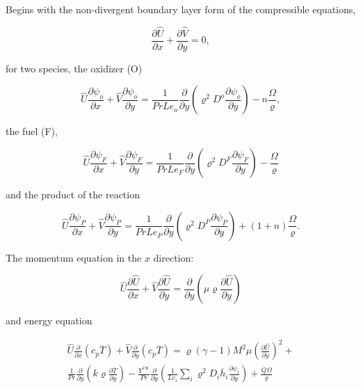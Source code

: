 Begins with the non-divergent boundary layer form of the compressible equations,

\begin{equation} 
\frac{\partial \hat{U}}{\partial x}+
\frac{\partial \hat{V}}{\partial y}
=0
,
\end{equation} 

for two  species, the oxidizer (O)  

\begin{equation} 
 \hat{U}\frac{\partial \psi_{o}}{\partial x}+
 \hat{V}\frac{\partial \psi_{o}}{\partial y}
=
\frac{1}{PrLe_o}\frac{\partial}{\partial y}
\left(\varrho^2 D^o\frac{\partial \psi_o}{\partial y}\right)
-
n
\frac{\Omega}{\varrho}
,
\end{equation} 
  
the fuel (F), 

\begin{equation} 
 \hat{U}\frac{\partial \psi_{F}}{\partial x}+
 \hat{V}\frac{\partial \psi_{F}}{\partial y}
=
\frac{1}{PrLe_F}\frac{\partial}{\partial y}
\left(
       \varrho^2 D^F\frac{\partial \psi_F}{\partial y}
\right)
- 
\frac{\Omega}{\varrho}
\end{equation} 

and the product of the reaction  

\begin{equation} 
 \hat{U}\frac{\partial \psi_{P}}{\partial x}+
 \hat{V}\frac{\partial \psi_{P}}{\partial y}
=
\frac{1}{PrLe_P}\frac{\partial}{\partial y}
\left(
       \varrho^2 D^P\frac{\partial \psi_P}{\partial y}
\right)
+ 
(1+n)
\frac{\Omega}{\varrho}
.
\end{equation} 

The momentum equation in the $x$ direction:
  
\begin{equation} 
 \hat{U}\frac{\partial \hat{U}}{\partial x}+
 \hat{V}\frac{\partial \hat{U}}{\partial y}=
\frac{\partial}{\partial y}\left(\mu\varrho\frac{\partial \hat{U}}{\partial  y}\right)
\end{equation} 
  
and energy equation 
  
\begin{equation}
\begin{split}
\hat{U}\frac{\partial }{\partial x}(c_p \overline{T})+
\hat{V}
\frac{\partial }{\partial y}(c_p \overline{T})=
\varrho
(\gamma-1)M^2\mu
\left(
\frac{\partial \hat{U}}{\partial y}
\right)
^2
+
\\
\frac{1}{Pr}\frac{\partial}{\partial y}\left(k\varrho\frac{\partial \overline{T}}{\partial y}\right)
-
\frac{Y^{i\infty}}{Pr}
\frac{\partial}{\partial y}
       \left(
              \frac{1}{Le_i}
              \sum_i\varrho^2 D_i\overline{h}_i\frac{\partial \psi_i}{\partial y}
       \right)
+
\frac{Q\Omega}{\varrho}
\end{split}
\end{equation} 

